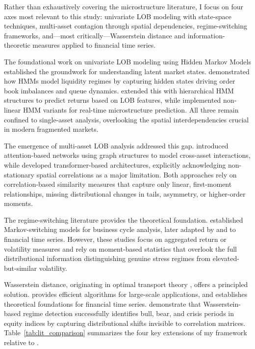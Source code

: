 \documentclass{article}
\begin{document}
Rather than exhaustively covering the microstructure literature, I focus on
four axes most relevant to this study: univariate LOB modeling with
state-space techniques, multi-asset contagion through spatial dependencies,
regime-switching frameworks, and---most critically---Wasserstein distance and
information-theoretic measures applied to financial time series.

The foundational work on univariate LOB modeling using Hidden Markov Models
established the groundwork for understanding latent market states.
\textcite{slupinski2020hidden} demonstrated how HMMs model liquidity regimes by
capturing hidden states driving order book imbalances and queue dynamics.
\textcite{wisebourt2011hierarchical} extended this with hierarchical HMM structures
to predict returns based on LOB features, while \textcite{kth2017online}
implemented non-linear HMM variants for real-time microstructure prediction.
All three remain confined to single-asset analysis, overlooking the spatial
interdependencies crucial in modern fragmented markets.

The emergence of multi-asset LOB analysis addressed this gap.
\textcite{kercheval2024attention} introduced attention-based networks using graph
structures to model cross-asset interactions, while \textcite{zhou2025tlob}
developed transformer-based architectures, explicitly acknowledging
non-stationary spatial correlations as a major limitation. Both approaches
rely on correlation-based similarity measures that capture only linear,
first-moment relationships, missing distributional changes in tails,
asymmetry, or higher-order moments.

The regime-switching literature provides the theoretical foundation.
\textcite{hamilton1989new} established Markov-switching models for business cycle
analysis, later adapted by \textcite{agnolucci2019market} and
\textcite{zheng2020regime} to financial time series. However, these studies focus
on aggregated return or volatility measures and rely on moment-based statistics
that overlook the full distributional information distinguishing genuine stress
regimes from elevated-but-similar volatility.

Wasserstein distance, originating in optimal transport theory
\parencite{villani2009optimal}, offers a principled solution.
\textcite{peyre2019computational} provides efficient algorithms for large-scale
applications, and \textcite{fournie2019wasserstein} establishes theoretical
foundations for financial time series. \textcite{horvath2021clustering} demonstrate
that Wasserstein-based regime detection successfully identifies bull, bear, and
crisis periods in equity indices by capturing distributional shifts invisible to
correlation matrices. Table~\ref{tab:lit_comparison} summarizes the four key
extensions of my framework relative to \textcite{horvath2021clustering}.
\end{document}
